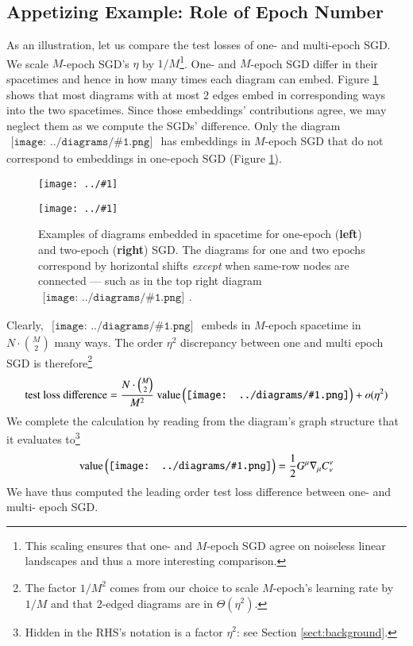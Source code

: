 \documentclass{article}
\theoremstyle{plain}
\theoremstyle{definition}
\newcommand{\dvalue}{\text{\textnormal{value}}}
\newcommand{\wrap}[1]{\left(#1\right)}
\newcommand{\plotmooh}[3]{
    \texttt{[image: ../\#1]}
}
\newcommand{\sdia}[1]{\begin{gathered}\texttt{[image: ../diagrams/\#1.png]}\end{gathered}}
\begin{document}
    \subsection{Appetizing Example: Role of Epoch Number}
            As an illustration, let us compare the test losses of one- and
            multi-epoch SGD.  We scale $M$-epoch SGD's $\eta$ by
            $1/M$\footnote{
                This scaling ensures that one- and $M$-epoch SGD
                agree on noiseless linear landscapes and thus a 
                more interesting comparison.
            }.
            One- and $M$-epoch SGD differ in their spacetimes and hence in how
            many times each diagram can embed.  Figure \ref{fig:epoch} shows
            that most diagrams with at most $2$ edges embed in corresponding
            ways into the two spacetimes.  Since those embeddings'
            contributions agree, we may neglect them as we compute the SGDs'
            difference.  Only the diagram
            $\sdia{c(01-2)(01-12)}$ has embeddings in $M$-epoch SGD that do not
            correspond to embeddings in one-epoch SGD (Figure \ref{fig:epoch}). 

            \begin{figure}[h!] 
                \centering  
                \plotmooh{diagrams/spacetime-c}{0.32\columnwidth}{0.32\columnwidth}
                \plotmooh{diagrams/spacetime-d}{0.64\columnwidth}{0.32\columnwidth}
                \caption{
                    Examples of diagrams embedded in spacetime for one-epoch
                    ({\bf left}) and two-epoch ({\bf right}) SGD.  The diagrams
                    for one and two epochs correspond by horizontal shifts
                    \emph{except} when same-row nodes are connected --- such as
                    in the top right diagram $\sdia{c(01-2)(01-12)}$. 
                }
                \label{fig:epoch}
            \end{figure}

            Clearly, $\sdia{c(01-2)(01-12)}$ embeds in $M$-epoch spacetime in
            $N\cdot{M\choose 2}$ many ways.  The order $\eta^2$ discrepancy
            between one and multi epoch SGD is therefore\footnote{
                The factor $1/M^2$ comes from our choice to scale $M$-epoch's
                learning rate by $1/M$ and that $2$-edged diagrams 
                are in $\Theta(\eta^2)$.
            }
            $$
                \text{test loss difference} =  
                \frac{N\cdot {M\choose 2}}{M^2}~
                \dvalue\wrap{\sdia{c(01-2)(01-12)}}
                + o(\eta^2)
            $$
            We complete the calculation by reading from the diagram's graph
            structure that it evaluates to\footnote{
                Hidden in the RHS's notation is a factor $\eta^2$: see  
                Section \ref{sect:background}.
            }
            \begin{align*}
                \dvalue\wrap{\sdia{c(01-2)(01-12)}}
                = 
                \frac{1}{2} G^\mu \nabla_\mu C^{\nu}_{\nu} 
            \end{align*}
            We have thus computed the leading order test loss difference
            between one- and multi- epoch SGD.
\end{document}
